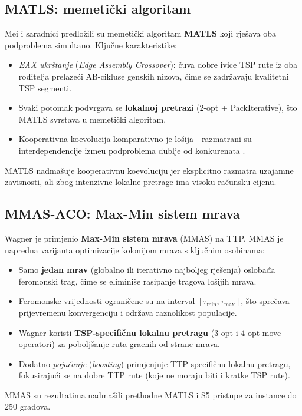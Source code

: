 \documentclass[12pt,a4paper]{article}
\begin{document}
\subsection{MATLS: memetički algoritam}

Mei i saradnici \cite{mei2014} predlo\v{z}ili su memetički algoritam \textbf{MATLS} koji rje\v{s}ava oba podproblema simultano. Klju\v{c}ne karakteristike:
\begin{itemize}
    \item \textit{EAX ukrštanje} (\textit{Edge Assembly Crossover}): \v{c}uva dobre ivice TSP rute iz oba roditelja prelazeći AB-cikluse genskih nizova, \v{c}ime se zadr\v{z}avaju kvalitetni TSP segmenti.
    \item Svaki potomak podvrgava se \textbf{lokalnoj pretrazi} (2-opt + PackIterative), što MATLS svrstava u memetički algoritam.
    \item Kooperativna koevolucija komparativno je lo\v{s}ija---razmatrani su interdependencije izme\dj{}u podproblema dublje od konkurenata \cite{mei2014}.
\end{itemize}
MATLS nadma\v{s}uje kooperativnu koevoluciju jer eksplicitno razmatra uzajamne zavisnosti, ali zbog intenzivne lokalne pretrage ima visoku ra\v{c}unsku cijenu.

\subsection{MMAS-ACO: Max-Min sistem mrava}

Wagner \cite{wagner2016} je primjenio \textbf{Max-Min sistem mrava} (MMAS) na TTP. MMAS je napredna varijanta optimizacije kolonijom mrava s klju\v{c}nim osobinama:
\begin{itemize}
    \item Samo \textbf{jedan mrav} (globalno ili iterativno najboljeg rje\v{s}enja) oslobađa feromonski trag, čime se eliminiše rasipanje tragova lo\v{s}ijih mrava.
    \item Feromonske vrijednosti ograni\v{c}ene su na interval $[\tau_{\min}, \tau_{\max}]$, što spre\v{c}ava prijevremenu konvergenciju i odr\v{z}ava raznolikost populacije.
    \item Wagner koristi \textbf{TSP-specifi\v{c}nu lokalnu pretragu} (3-opt i 4-opt move operatori) za pobolj\v{s}anje ruta gra\dj{}enih od strane mrava.
    \item Dodatno \textit{poja\v{c}anje} (\textit{boosting}) primjenjuje TTP-specifi\v{c}nu lokalnu pretragu, fokusiraju\'{c}i se na dobre TTP rute (koje ne moraju biti i kratke TSP rute).
\end{itemize}
MMAS su rezultatima nadma\v{s}ili prethodne MATLS i S5 pristupe za instance do 250 gradova.
\end{document}
